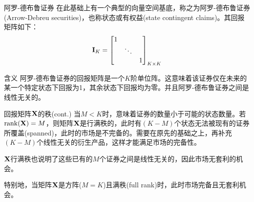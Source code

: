 \documentclass[t]{beamer}
\begin{document}
\begin{frame}{阿罗-德布鲁证券}
在此基础上有一个典型的向量空间基底，称之为阿罗-德布鲁证券(Arrow-Debreu securities)，也称状态或有权益(state contingent claims)。其回报矩阵如下：
\[ {\bf I}_K=\begin{bmatrix}
1\\
&\ddots\\
&&1
\end{bmatrix}_{K\times K}\]

\begin{block}{含义}
	阿罗-德布鲁证券的回报矩阵是一个$K$阶单位阵。这意味着该证券仅在未来的某一个特定状态下回报为1，其余状态下回报均为零。并且阿罗-德布鲁证券之间是线性无关的。
\end{block}
\end{frame}

\begin{frame}{回报矩阵${\bf X}$的秩(cont.)}
当$M<K$时，意味着证券的数量小于可能的状态数量。若${\rm rank}({\bf X})= M$，则矩阵$\bf X$是行满秩的，此时有$(K-M)$个状态无法被现有的证券所覆盖(spanned)，此时的市场是不完备的。需要在原先的基础之上，再补充$(K-M)$个线性无关的衍生产品，这样才能满足市场的完备性。

$\bf X$行满秩也说明了这些已有的$M$个证券之间是线性无关的，因此市场无套利的机会。

\begin{block}{}
特别地，当矩阵$\bf X$是方阵($M=K$)且满秩(full rank)时，此时市场完备且无套利机会。
\end{block}
\end{frame}
\end{document}
